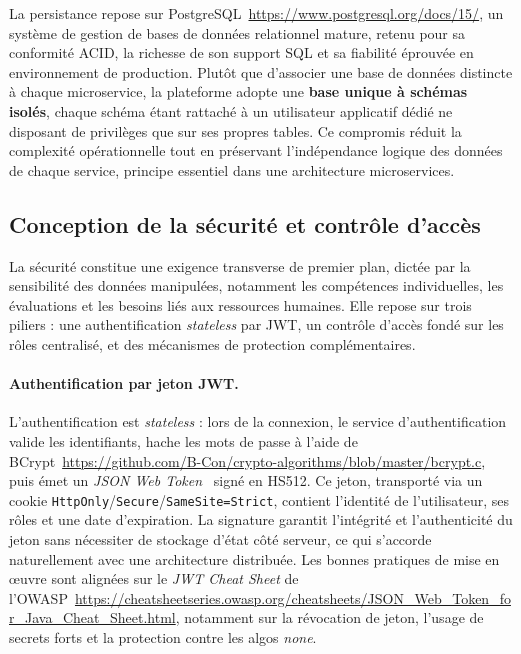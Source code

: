 \documentclass[12pt,a4paper]{report}
\begin{document}
La persistance repose sur PostgreSQL~\url{https://www.postgresql.org/docs/15/}, un système de
gestion de bases de données relationnel mature, retenu pour sa conformité
ACID, la richesse de son support SQL et sa fiabilité éprouvée en
environnement de production. Plutôt que d'associer une base de données
distincte à chaque microservice, la plateforme adopte une \textbf{base
unique à schémas isolés}, chaque schéma étant rattaché à un utilisateur
applicatif dédié ne disposant de privilèges que sur ses propres tables. Ce
compromis réduit la complexité opérationnelle tout en préservant
l'indépendance logique des données de chaque service, principe essentiel
dans une architecture microservices.

\subsection{Conception de la sécurité et contrôle d'accès}
\label{sec:rbac}

La sécurité constitue une exigence transverse de premier plan, dictée par
la sensibilité des données manipulées, notamment les compétences
individuelles, les évaluations et les besoins liés aux ressources
humaines. Elle repose sur trois piliers : une authentification
\textit{stateless} par JWT, un contrôle d'accès fondé sur les rôles
centralisé, et des mécanismes de protection complémentaires.

\paragraph{Authentification par jeton JWT.}
L'authentification est \textit{stateless} : lors de la connexion, le
service d'authentification valide les identifiants, hache les mots de passe
à l'aide de BCrypt~\url{https://github.com/B-Con/crypto-algorithms/blob/master/bcrypt.c}, puis émet un \textit{JSON Web
Token}~\cite{rfc7519} signé en HS512. Ce jeton, transporté via un cookie
\texttt{HttpOnly}/\texttt{Secure}/\texttt{SameSite=Strict}, contient
l'identité de l'utilisateur, ses rôles et une date d'expiration. La
signature garantit l'intégrité et l'authenticité du jeton sans nécessiter
de stockage d'état côté serveur, ce qui s'accorde naturellement avec une
architecture distribuée. Les bonnes pratiques de mise en \oe{}uvre sont
alignées sur le \textit{JWT Cheat Sheet} de l'OWASP~\url{https://cheatsheetseries.owasp.org/cheatsheets/JSON_Web_Token_for_Java_Cheat_Sheet.html},
notamment sur la révocation de jeton, l'usage de secrets forts et la
protection contre les algos \emph{none}.
\end{document}
